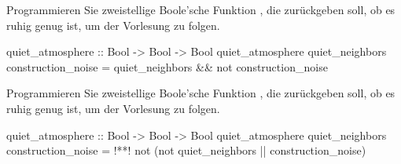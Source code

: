 \begin{frame}[fragile]\onslide<+->%
    \begin{exercise}
    Programmieren Sie zweistellige Boole'sche Funktion , die zurückgeben soll, ob es ruhig genug ist, um der Vorlesung zu folgen.
    \end{exercise}
    \begin{solve}
    \begin{plainhaskell}
quiet_atmosphere :: Bool -> Bool -> Bool
quiet_atmosphere quiet_neighbors construction_noise = quiet_neighbors && not construction_noise
    \end{plainhaskell}
    \end{solve}
\end{frame}
\resetframecounters
\begin{frame}\onslide<+->%
    \begin{exercise}
    Programmieren Sie zweistellige Boole'sche Funktion , die zurückgeben soll, ob es ruhig genug ist, um der Vorlesung zu folgen.
    \end{exercise}
    \begin{solve}
    \begin{plainhaskell}
quiet_atmosphere :: Bool -> Bool -> Bool
quiet_atmosphere quiet_neighbors construction_noise = !*\sol@styles@lst@comments\sol@lst@prebreak*!
   not (not quiet_neighbors || construction_noise)
    \end{plainhaskell}
    \end{solve}
\end{frame}